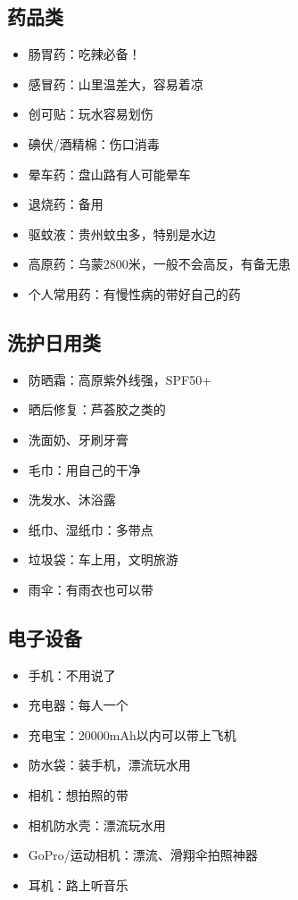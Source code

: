 \documentclass[12pt,a4paper,UTF8]{ctexart}
\begin{document}
\subsection{药品类}
\begin{itemize}
\item 肠胃药：吃辣必备！
\item 感冒药：山里温差大，容易着凉
\item 创可贴：玩水容易划伤
\item 碘伏/酒精棉：伤口消毒
\item 晕车药：盘山路有人可能晕车
\item 退烧药：备用
\item 驱蚊液：贵州蚊虫多，特别是水边
\item 高原药：乌蒙2800米，一般不会高反，有备无患
\item 个人常用药：有慢性病的带好自己的药
\end{itemize}

\subsection{洗护日用类}
\begin{itemize}
\item 防晒霜：高原紫外线强，SPF50+
\item 晒后修复：芦荟胶之类的
\item 洗面奶、牙刷牙膏
\item 毛巾：用自己的干净
\item 洗发水、沐浴露
\item 纸巾、湿纸巾：多带点
\item 垃圾袋：车上用，文明旅游
\item 雨伞：有雨衣也可以带
\end{itemize}

\subsection{电子设备}
\begin{itemize}
\item 手机：不用说了
\item 充电器：每人一个
\item 充电宝：20000mAh以内可以带上飞机
\item 防水袋：装手机，漂流玩水用
\item 相机：想拍照的带
\item 相机防水壳：漂流玩水用
\item GoPro/运动相机：漂流、滑翔伞拍照神器
\item 耳机：路上听音乐
\end{itemize}
\end{document}
